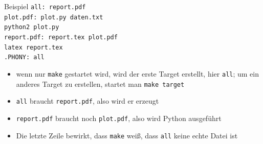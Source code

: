 \begin{frame}{Beispiel}
  \texttt{all: report.pdf\\[0.5cm]
    plot.pdf: plot.py daten.txt\\
    \hspace{1cm} python2 plot.py\\[0.5cm]
    report.pdf: report.tex plot.pdf\\
    \hspace{1cm} latex report.tex\\[0.5cm]
    .PHONY: all
  }

  \begin{itemize}
    \item wenn nur \texttt{make} gestartet wird, wird der erste Target erstellt, hier \texttt{all}; um ein anderes Target zu erstellen, startet man \texttt{make target}
    \item \texttt{all} braucht \texttt{report.pdf}, also wird er erzeugt
    \item \texttt{report.pdf} braucht noch \texttt{plot.pdf}, also wird Python ausgeführt
    \item Die letzte Zeile bewirkt, dass \texttt{make} weiß, dass \texttt{all} keine echte Datei ist
  \end{itemize}
\end{frame}
